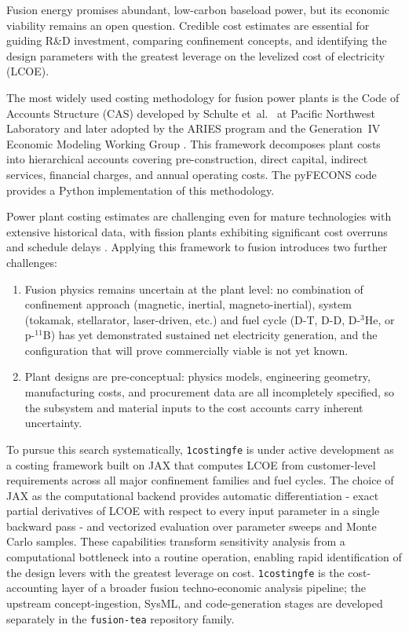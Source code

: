 \documentclass{article}
\begin{document}
Fusion energy promises abundant, low-carbon baseload power, but its economic
viability remains an open question. Credible cost estimates are essential for
guiding R\&D investment, comparing confinement concepts, and identifying the
design parameters with the greatest leverage on the levelized cost of
electricity (LCOE).

The most widely used costing methodology for fusion power plants is the
Code of Accounts Structure (CAS) developed by Schulte et~al.\
\citep{schulte1978} at Pacific Northwest Laboratory and later adopted by
the ARIES program \citep{miller1998} and the Generation~IV Economic Modeling
Working Group \citep{emwg2007}. This framework decomposes plant costs into
hierarchical accounts covering pre-construction, direct capital, indirect
services, financial charges, and annual operating costs. The pyFECONS
code \citep{woodruff2026, woodruff2026b} provides a Python implementation of this
methodology.

Power plant costing estimates are challenging even for mature technologies
with extensive historical data, with fission plants exhibiting significant
cost overruns and schedule delays \citep{eashgates2020}. Applying this
framework to fusion introduces two further challenges:
\begin{enumerate}
\item Fusion physics remains uncertain at the plant level: no
  combination of confinement approach (magnetic, inertial,
  magneto-inertial), system (tokamak, stellarator, laser-driven, etc.)
  and fuel cycle (D-T, D-D, D-${}^3$He, or p-${}^{11}$B) has yet
  demonstrated sustained net electricity generation, and the
  configuration that will prove commercially viable is not yet known.
\item Plant designs are pre-conceptual: physics models, engineering
  geometry, manufacturing costs, and procurement data are all
  incompletely specified, so the subsystem and material inputs to
  the cost accounts carry inherent uncertainty.
\end{enumerate}

To pursue this search systematically, \texttt{1costingfe} is under active development as a
costing framework built on JAX that computes LCOE from customer-level
requirements across all major confinement families and fuel cycles. The
choice of JAX as the computational backend provides automatic
differentiation - exact partial derivatives of LCOE with respect to every
input parameter in a single backward pass - and vectorized evaluation over
parameter sweeps and Monte Carlo samples. These capabilities transform
sensitivity analysis from a computational bottleneck into a routine
operation, enabling rapid identification of the design levers with the
greatest leverage on cost.
\texttt{1costingfe} is the cost-accounting layer of a broader fusion
techno-economic analysis pipeline; the upstream concept-ingestion,
SysML, and code-generation stages are developed separately in the
\texttt{fusion-tea} repository family.
\end{document}
